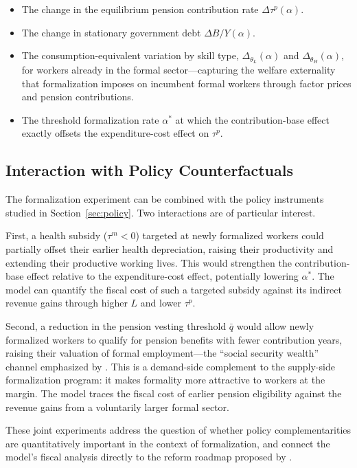 \documentclass[12pt,a4paper]{article}
\begin{document}
\begin{itemize}
    \item The change in the equilibrium pension contribution rate $\Delta \tau^p(\alpha)$.
    \item The change in stationary government debt $\Delta B/Y(\alpha)$.
    \item The consumption-equivalent variation by skill type, $\Delta_{\theta_L}(\alpha)$ and $\Delta_{\theta_H}(\alpha)$, for workers already in the formal sector---capturing the welfare externality that formalization imposes on incumbent formal workers through factor prices and pension contributions.
    \item The threshold formalization rate $\alpha^*$ at which the contribution-base effect exactly offsets the expenditure-cost effect on $\tau^p$.
\end{itemize}

\subsection{Interaction with Policy Counterfactuals}
\label{subsec:form_interaction}

The formalization experiment can be combined with the policy instruments studied in Section~\ref{sec:policy}. Two interactions are of particular interest.

First, a health subsidy ($\tau^m < 0$) targeted at newly formalized workers could partially offset their earlier health depreciation, raising their productivity and extending their productive working lives. This would strengthen the contribution-base effect relative to the expenditure-cost effect, potentially lowering $\alpha^*$. The model can quantify the fiscal cost of such a targeted subsidy against its indirect revenue gains through higher $L$ and lower $\tau^p$.

Second, a reduction in the pension vesting threshold $\bar{q}$ would allow newly formalized workers to qualify for pension benefits with fewer contribution years, raising their valuation of formal employment---the ``social security wealth'' channel emphasized by \citet{WorldBankInformalizing2025}. This is a demand-side complement to the supply-side formalization program: it makes formality more attractive to workers at the margin. The model traces the fiscal cost of earlier pension eligibility against the revenue gains from a voluntarily larger formal sector.

These joint experiments address the question of whether policy complementarities are quantitatively important in the context of formalization, and connect the model's fiscal analysis directly to the reform roadmap proposed by \citet{WorldBankInformalizing2025}.
\end{document}
